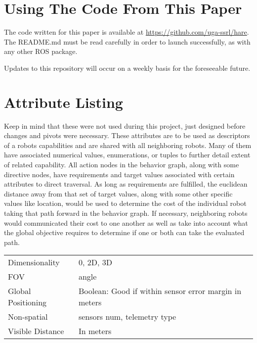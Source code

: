 \section{Using The Code From This Paper}        %
The code written for this paper is available at
\url{https://github.com/uga-ssrl/hare}.
The README.md must be read carefully in order to launch successfully, as with any other ROS package.

Updates to this repository will occur on a weekly basis for the foreseeable future.

\section{Attribute Listing}

Keep in mind that these were not used during this project, just designed
before changes and pivots were necessary. These attributes are to be used
as descriptors of a robots capabilities and are shared with all neighboring
robots. Many of them have associated numerical values, enumerations, or tuples
to further detail extent of related capability. All action nodes in the behavior
graph, along with some directive nodes, have requirements and target values associated
with certain attributes to direct traversal. As long as requirements are fulfilled,
the euclidean distance away from that set of target values, along with some other
specific values like location, would be used to determine the cost of the individual
robot taking that path forward in the behavior graph. If necessary, neighboring robots
would communicated their cost to one another as well as take into account what the global
objective requires to determine if one or both can take the evaluated path.

\begin{center}
  \begin{tabularx}{\textwidth}{ |X|X| }
  \hline
  Dimensionality & 0, 2D, 3D \\
  FOV & angle \\ \hline
  Global Positioning & Boolean: Good if within sensor error margin in meters \\
  Non-spatial & sensors num, telemetry type \\
  Visible Distance & In meters \\
  \hline
\end{tabularx}
\end{center}


